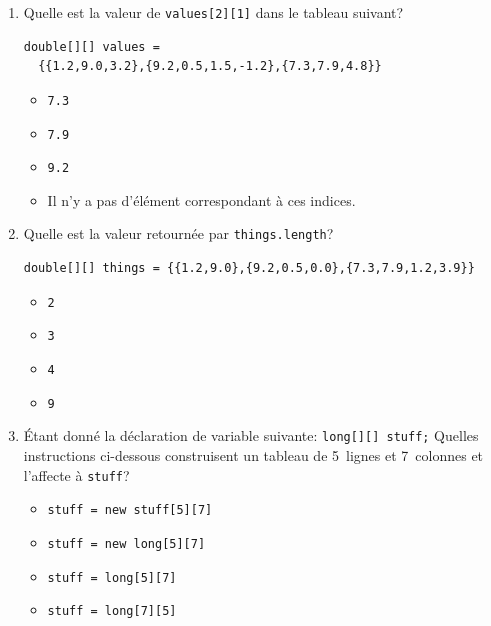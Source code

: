 \documentclass[10pt,a4paper]{article}
\newcommand{\boxitem}{\item[\(\Box\)]}
\begin{document}
\begin{enumerate}

  \item Quelle est la valeur de {\small \verb+values[2][1]+} dans le
  tableau suivant?
  {\small
  \begin{verbatim}
double[][] values =
  {{1.2,9.0,3.2},{9.2,0.5,1.5,-1.2},{7.3,7.9,4.8}}
  \end{verbatim}}
  \vspace*{-15pt}
  \begin{itemize}
    \boxitem {\small \verb+7.3+}
    \boxitem {\small \verb+7.9+}
    \boxitem {\small \verb+9.2+}
    \boxitem Il n'y a pas d'élément correspondant à ces indices.
  \end{itemize}

  \item Quelle est la valeur retournée par {\small \verb+things.length+}?
   {\small
   \begin{verbatim}
double[][] things = {{1.2,9.0},{9.2,0.5,0.0},{7.3,7.9,1.2,3.9}}
  \end{verbatim}}
  \vspace*{-15pt}
  \begin{itemize}
    \boxitem {\small \verb+2+}
    \boxitem {\small \verb+3+}
    \boxitem {\small \verb+4+}
    \boxitem {\small \verb+9+}
  \end{itemize}

  \item Étant donné la déclaration de variable suivante:
  {\small \verb+long[][] stuff;+}
  Quelles instructions ci-dessous construisent un tableau de 5~lignes et
  7~colonnes et l'affecte à {\small \verb+stuff+}?
  \begin{itemize}
    \boxitem {\small \verb+stuff = new stuff[5][7]+}
    \boxitem {\small \verb+stuff = new long[5][7]+}
    \boxitem {\small \verb+stuff = long[5][7]+}
    \boxitem {\small \verb+stuff = long[7][5]+}
  \end{itemize}

\newpage


\end{enumerate}
\end{document}
